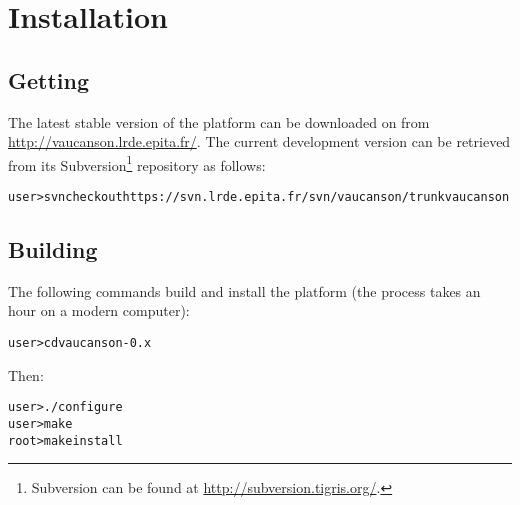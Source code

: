 \chapter{Installation}

\section{Getting \Vauc}

The latest stable version of the \Vauc platform can be downloaded on
from \url{http://vaucanson.lrde.epita.fr/}.  The current development
version can be retrieved from its Subversion\footnote{%
  Subversion can be found at \url{http://subversion.tigris.org/}.
} repository as follows:

\begin{alltt}
user> svn checkout https://svn.lrde.epita.fr/svn/vaucanson/trunk vaucanson
\end{alltt}

\section{Building \Vauc}
The following commands build and install the platform (the process
takes an hour on a modern computer):
\begin{alltt}
user> cd vaucanson-0.x
\end{alltt}
Then:
\begin{alltt}
user> ./configure
user> make
root> make install
\end{alltt}
